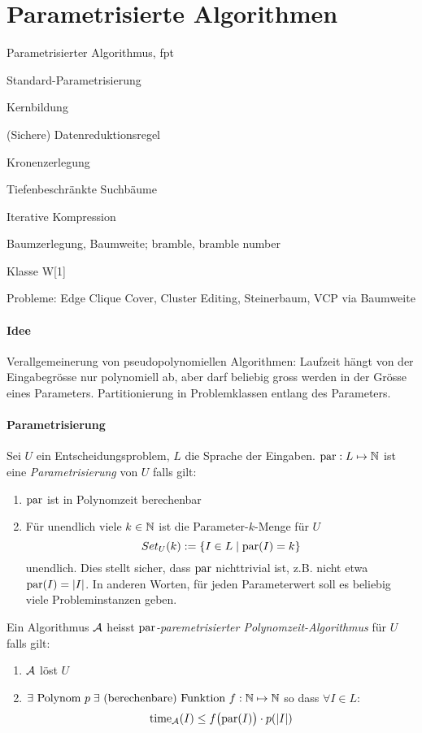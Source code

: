 \section{Parametrisierte Algorithmen}

\begin{takeaway}
    \item Parametrisierter Algorithmus, fpt
    \item Standard-Parametrisierung
    \item Kernbildung
    \item (Sichere) Datenreduktionsregel
    \item Kronenzerlegung
    \item Tiefenbeschränkte Suchbäume
    \item Iterative Kompression
    \item Baumzerlegung, Baumweite; bramble, bramble number
    \item Klasse W[1]
    \item Probleme: Edge Clique Cover, Cluster Editing, Steinerbaum, VCP via Baumweite
\end{takeaway}

\paragraph{Idee}
Verallgemeinerung von pseudopolynomiellen Algorithmen:
Laufzeit hängt von der Eingabegrösse nur polynomiell ab, aber darf beliebig gross werden in der Grösse eines Parameters.
Partitionierung in Problemklassen entlang des Parameters.

\paragraph{Parametrisierung}
Sei $U$ ein Entscheidungsproblem, $L$ die Sprache der Eingaben.
$\text{par}: L \mapsto \mathbb{N}$ ist eine \emph{Parametrisierung} von $U$ falls gilt:
\begin{enumerate}[label=(\roman*)]
    \item $\text{par}$ ist in Polynomzeit berechenbar
    \item Für unendlich viele $k \in \mathbb{N}$ ist die Parameter-$k$-Menge für $U$
    $$ Set_U(k) := \{ I \in L \; | \; \text{par}(I) = k \} $$ unendlich.
    Dies stellt sicher, dass $\text{par}$ nichttrivial ist, z.B. nicht etwa $\text{par}(I) = |I|$.
    In anderen Worten, für jeden Parameterwert soll es beliebig viele Probleminstanzen geben.
\end{enumerate}
Ein Algorithmus $\mathcal{A}$ heisst \emph{$\text{par}$-paremetrisierter Polynomzeit-Algorithmus} für $U$ falls gilt:
\begin{enumerate}[label=(\roman*)]
    \item $\mathcal{A}$ löst $U$
    \item $ \exists \text{ Polynom } p \; \exists \text{ (berechenbare) Funktion } f : \mathbb{N} \mapsto \mathbb{N}$
    so dass $\forall I \in L$:
    $$\text{time}_{\mathcal{A}}(I) \leq f \big( \text{par}(I) \big) \cdot p(|I|) $$
\end{enumerate}

